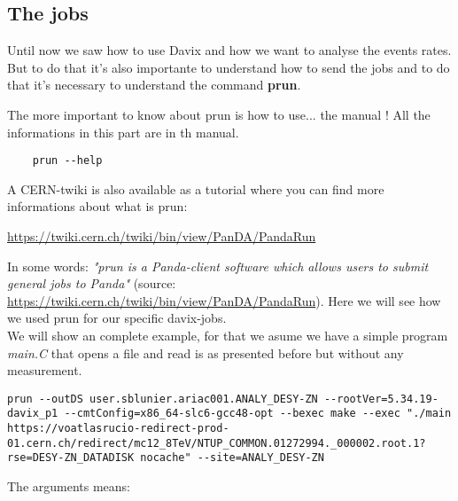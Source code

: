\subsection{The jobs}

Until now we saw how to use Davix and how we want to analyse the events rates. But to do that it's also importante to understand how to send the jobs and to do that it's necessary to understand the command \textbf{prun}.

The more important to know about prun is how to use... the manual ! All the informations in this part are in th manual.

\lstset{language=bash}
\begin{lstlisting}
	prun --help
\end{lstlisting}

A CERN-twiki is also available as a tutorial where you can find more informations about what is prun:\\
\begin{center}
	\url{https://twiki.cern.ch/twiki/bin/view/PanDA/PandaRun}
\end{center}

In some words: \textit{"prun is a Panda-client software which allows users to submit general jobs to Panda"} (source: \url{https://twiki.cern.ch/twiki/bin/view/PanDA/PandaRun}). Here we will see how we used prun for our specific davix-jobs.\\

We will show an complete example, for that we asume we have a simple program \textit{main.C} that opens a file and read is as presented before but without any measurement. 

\begin{lstlisting}
prun --outDS user.sblunier.ariac001.ANALY_DESY-ZN --rootVer=5.34.19-davix_p1 --cmtConfig=x86_64-slc6-gcc48-opt --bexec make --exec "./main https://voatlasrucio-redirect-prod-01.cern.ch/redirect/mc12_8TeV/NTUP_COMMON.01272994._000002.root.1?rse=DESY-ZN_DATADISK nocache" --site=ANALY_DESY-ZN
\end{lstlisting}

The arguments means:

